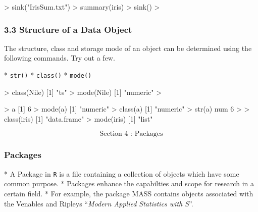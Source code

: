  
 \begin{framed}
 \begin{semiverbatim}
 > sink("IrisSum.txt")
 > summary(iris)
 > sink()
 >
 \end{semiverbatim}
 \end{framed}
 
 
 
 
 \frametitle{3.3 Structure of a Data Object}
 
 The structure, class and storage mode of an object can be determined using the following
 commands. Try out a few.
 
*   \texttt{str()}
*   \texttt{class()}
*   \texttt{mode()}

 
 
 
 
 \begin{framed}
 \begin{semiverbatim}
 > class(Nile)
 [1] "ts"
 > mode(Nile)
 [1] "numeric"
 >
 
 \end{semiverbatim}
 \end{framed}
 
 
 
 \begin{semiverbatim}
 > a
 [1] 6
 > mode(a)
 [1] "numeric"
 > class(a)
 [1] "numeric"
 > str(a)
 num 6
 >
 > class(iris)
 [1] "data.frame"
 > mode(iris)
 [1] "list"
 \end{semiverbatim}
 
 
 
 
 \Huge
 \[\mbox{ Section 4 : Packages } \]
 
 
 \frametitle{Packages}
 
 
*  A Package in \texttt{R} is a file containing a collection of objects which have some common purpose.
*  Packages enhance the capabilties and scope for research in a certain field. 
*  For example, the
 package MASS contains objects associated with the Venables and Ripleys ``\textit{Modern Applied
 Statistics with S}”. 

